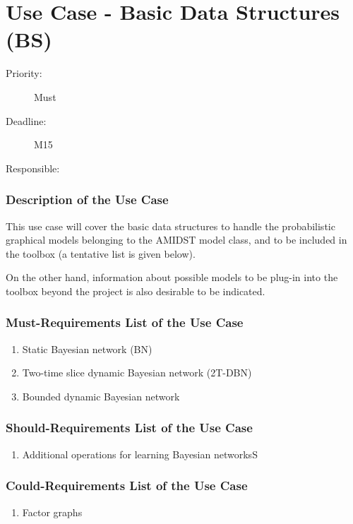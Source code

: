 \newpage
\section{Use Case - Basic Data Structures (BS)}
\label{UseCase:BS}

\begin{description}
\item[Priority:] Must
\item[Deadline:] M15
\item[Responsible:] 
\end{description}

\subsubsection*{Description of the Use Case}

This use case will cover the basic data structures to handle the probabilistic graphical models belonging to the AMIDST model class, and to be included in the toolbox (a tentative list is given below).

On the other hand, information about possible models to be plug-in into the toolbox beyond the project is also desirable to be indicated.  

\subsubsection*{Must-Requirements List of the Use Case}

\begin{enumerate}
\item Static Bayesian network (BN)
\item Two-time slice dynamic Bayesian network (2T-DBN)
\item Bounded dynamic Bayesian network 
\end{enumerate}

\subsubsection*{Should-Requirements List of the Use Case}

\begin{enumerate}
\item Additional operations for learning Bayesian networksS
\end{enumerate}

\subsubsection*{Could-Requirements List of the Use Case}

\begin{enumerate}
\item Factor graphs
\end{enumerate}